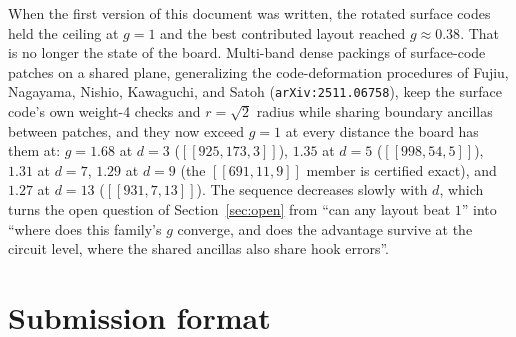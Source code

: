\documentclass[11pt]{article}
\begin{document}
	When the first version of this document was written, the rotated surface
	codes held the ceiling at $g=1$ and the best contributed layout reached
	$g\approx0.38$. That is no longer the state of the board. Multi-band
	dense packings of surface-code patches on a shared plane, generalizing
	the code-deformation procedures of Fujiu, Nagayama, Nishio, Kawaguchi,
	and Satoh (\texttt{arXiv:2511.06758}), keep the surface code's own
	weight-4 checks and $r=\sqrt2$ radius while sharing boundary ancillas
	between patches, and they now exceed $g=1$ at every distance the board
	has them at: $g=1.68$ at $d=3$ ($[[925,173,3]]$), $1.35$ at $d=5$
	($[[998,54,5]]$), $1.31$ at $d=7$, $1.29$ at $d=9$ (the $[[691,11,9]]$
	member is certified exact), and $1.27$ at $d=13$ ($[[931,7,13]]$). The
	sequence decreases slowly with $d$, which turns the open question of
	Section~\ref{sec:open} from ``can any layout beat $1$'' into ``where does
	this family's $g$ converge, and does the advantage survive at the
	circuit level, where the shared ancillas also share hook errors''.

	\section{Submission format}
\end{document}
